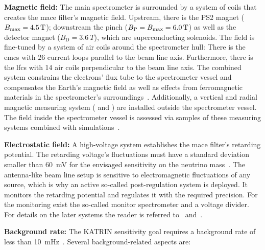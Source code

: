 {\par \textbf{Magnetic field:} The main spectrometer is surrounded by a system of coils that creates the \gls{mace} filter's  magnetic field. Upstream, there is the PS2 magnet ($B_\mathrm{max}=\SI{4.5}{T}$); downstream the pinch ($B_\mathrm{P}=B_\mathrm{max}=\SI{6.0}{T}$) as well as the detector magnet ($B_\mathrm{D}=\SI{3.6}{T}$), which are superconducting solenoids. The field is fine-tuned by a system of air coils around the spectrometer hull: There is the \gls{emcs} with 26 current loops parallel to the beam line axis. Furthermore, there is the \gls{lfcs} with 14 air coils perpendicular to the beam line axis. The combined system constrains the electrons' flux tube to the spectrometer vessel and compensates the Earth's magnetic field as well as effects from ferromagnetic materials in the spectrometer's surroundings~\cite{Erhard2018}. Additionally, a vertical and radial magnetic measuring system ( and ) are installed outside the spectrometer vessel. The field inside the spectrometer vessel is assessed via samples of these measuring systems combined with simulations~\cite{Letnev2018}.}

{\par \textbf{Electrostatic field:} A high-voltage system establishes the \gls{mace} filter's retarding potential. The retarding voltage's fluctuations must have a standard deviation smaller than \SI{60}{mV} for the envisaged sensitivity on the neutrino mass~\cite{Angrik:2005ep}. The antenna-like beam line setup is sensitive to electromagnetic fluctuations of any source, which is why an active so-called post-regulation system is deployed. It monitors the retarding potential and regulates it with the required precision. For the monitoring exist the so-called monitor spectrometer and a voltage divider. For details on the later systems the reader is referred to~\cite{Thuemmler2009} and~\cite{Erhard2014}.}

\par \textbf{Background rate:} The KATRIN sensitivity goal requires a background rate of less than \SI{10}{mHz}~\cite{Angrik:2005ep}. Several background-related aspects are:

